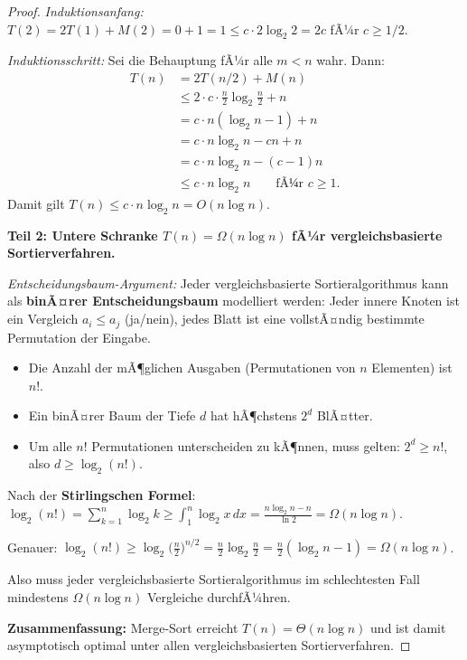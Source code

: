 ﻿\documentclass[a4paper,12pt]{report}
\theoremstyle{definition}
\begin{document}
\begin{proof}
    \emph{Induktionsanfang:} $T(2) = 2T(1) + M(2) = 0 + 1 = 1
    \leq c \cdot 2 \log_2 2 = 2c$ fÃ¼r $c \geq 1/2$.

    \emph{Induktionsschritt:} Sei die Behauptung fÃ¼r alle $m < n$ wahr.
    Dann:
    \begin{align*}
        T(n) &= 2T(n/2) + M(n) \\
             &\leq 2 \cdot c \cdot \tfrac{n}{2} \log_2 \tfrac{n}{2} + n \\
             &= c \cdot n (\log_2 n - 1) + n \\
             &= c \cdot n \log_2 n - cn + n \\
             &= c \cdot n \log_2 n - (c-1)n \\
             &\leq c \cdot n \log_2 n \qquad \text{fÃ¼r } c \geq 1.
    \end{align*}
    Damit gilt $T(n) \leq c \cdot n \log_2 n = O(n \log n)$.

    \textbf{Teil 2: Untere Schranke $T(n) = \Omega(n \log n)$
    fÃ¼r vergleichsbasierte Sortierverfahren.}

    \emph{Entscheidungsbaum-Argument:}
    Jeder vergleichsbasierte Sortieralgorithmus kann als
    \textbf{binÃ¤rer Entscheidungsbaum} modelliert werden:
    Jeder innere Knoten ist ein Vergleich $a_i \leq a_j$ (ja/nein),
    jedes Blatt ist eine vollstÃ¤ndig bestimmte Permutation der Eingabe.

    \begin{itemize}
        \item[-] Die Anzahl der mÃ¶glichen Ausgaben (Permutationen
              von $n$ Elementen) ist $n!$.
        \item[-] Ein binÃ¤rer Baum der Tiefe $d$ hat hÃ¶chstens $2^d$ BlÃ¤tter.
        \item[-] Um alle $n!$ Permutationen unterscheiden zu kÃ¶nnen,
              muss gelten: $2^d \geq n!$, also $d \geq \log_2(n!)$.
    \end{itemize}

    Nach der \textbf{Stirlingschen Formel}:
    $\log_2(n!) = \sum_{k=1}^n \log_2 k \geq \int_1^n \log_2 x\, dx
    = \frac{n \log_2 n - n}{\ln 2} = \Omega(n \log n)$.

    Genauer: $\log_2(n!) \geq \log_2\bigl(\frac{n}{2}\bigr)^{n/2}
    = \frac{n}{2} \log_2 \frac{n}{2} = \frac{n}{2}(\log_2 n - 1)
    = \Omega(n \log n)$.

    Also muss jeder vergleichsbasierte Sortieralgorithmus im
    schlechtesten Fall mindestens $\Omega(n \log n)$ Vergleiche
    durchfÃ¼hren.

    \textbf{Zusammenfassung:} Merge-Sort erreicht $T(n) = \Theta(n \log n)$
    und ist damit asymptotisch optimal unter allen
    vergleichsbasierten Sortierverfahren.
\end{proof}
\end{document}
